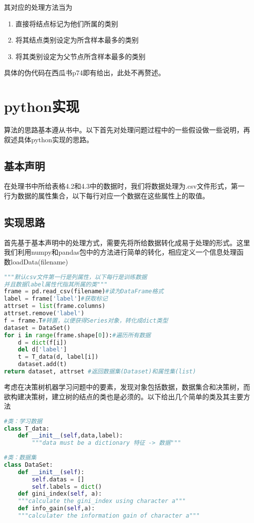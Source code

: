 \documentclass[UTF8]{ctexart}
\begin{document}
其对应的处理方法当为
\begin{enumerate}[i]
	\item 直接将结点标记为他们所属的类别
	\item 将其结点类别设定为所含样本最多的类别
	\item 将其类别设定为父节点所含样本最多的类别
\end{enumerate}

具体的伪代码在西瓜书p74即有给出，此处不再赘述。
\newpage
\section{python实现}
算法的思路基本遵从书中。以下首先对处理问题过程中的一些假设做一些说明，再叙述具体python实现的思路。
\subsection{基本声明}
在处理书中所给表格4.2和4.3中的数据时，我们将数据处理为.csv文件形式，第一行为数据的属性集合，以下每行对应一个数据在这些属性上的取值。
\subsection{实现思路}
首先基于基本声明中的处理方式，需要先将所给数据转化成易于处理的形式。这里我们利用numpy和pandas包中的方法进行简单的转化，相应定义一个信息处理函数loadData(filename)
\begin{lstlisting}[language = python]
"""默认csv文件第一行是列属性，以下每行是训练数据
并且数据label属性代指其所属的类"""
frame = pd.read_csv(filename)#读为DataFrame格式
label = frame['label']#获取标记
attrset = list(frame.columns)
attrset.remove('label')
f = frame.T#转置，以便获得Series对象，转化成dict类型
dataset = DataSet()
for i in range(frame.shape[0]):#遍历所有数据
	d = dict(f[i])
	del d['label']
	t = T_data(d, label[i])
	dataset.add(t)
return dataset, attrset #返回数据集(Dataset)和属性集(list)
\end{lstlisting}

考虑在决策树机器学习问题中的要素，发现对象包括数据，数据集合和决策树，而欲构建决策树，建立树的结点的类也是必须的。以下给出几个简单的类及其主要方法
\begin{lstlisting}[language = python]
#类：学习数据
class T_data:
	def __init__(self,data,label):
		"""data must be a dictionary 特征 -> 数据"""
		
#类：数据集
class DataSet:
	def __init__(self):
		self.datas = []
		self.labels = dict()
	def gini_index(self, a):
	"""calculate the gini_index using character a"""
	def info_gain(self,a):
	"""calculater the information gain of character a"""
\end{lstlisting}
\end{document}
